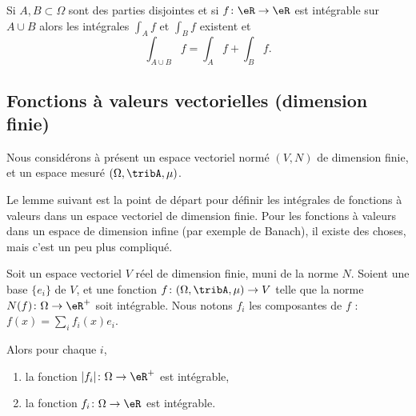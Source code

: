 \begin{proposition}     \label{PropOPSCooVpzaBt}
    Si \( A,B\subset \Omega\) sont des parties disjointes et si \( f\colon \eR\to \eR\) est intégrable sur \( A\cup B\) alors les intégrales \( \int_Af\) et \( \int_Bf\) existent et
    \begin{equation}
        \int_{A\cup B}f=\int_Af+\int_Bf.
    \end{equation}
\end{proposition}

\subsection{Fonctions à valeurs vectorielles (dimension finie)}

Nous considérons à présent un espace vectoriel normé \( (V,N)\) de dimension finie, et un espace mesuré \( (\Omega,\tribA,\mu)\).

Le lemme suivant est la point de départ pour définir les intégrales de fonctions à valeurs dans un espace vectoriel de dimension finie. Pour les fonctions à valeurs dans un espace de dimension infine (par exemple de Banach), il existe des choses, mais c'est un peu plus compliqué.
\begin{lemma}
    Soit un espace vectoriel \( V\) réel de dimension finie, muni de la norme \( N\). Soient une base \( \{ e_i \}\) de \( V\), et une fonction \( f\colon (\Omega,\tribA,\mu)\to V\) telle que la norme \( N(f)\colon \Omega\to \eR^+\) soit intégrable. Nous notons \( f_i\) les composantes de \( f\) : \( f(x)=\sum_if_i(x)e_i\).

    Alors pour chaque \( i\),
    \begin{enumerate}
        \item
            la fonction \( | f_i |\colon \Omega\to \eR^+\) est intégrable,
        \item
            la fonction \( f_i\colon \Omega\to \eR\) est intégrable.
    \end{enumerate}
\end{lemma}

